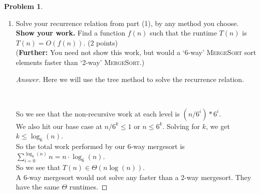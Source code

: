 \documentclass[11pt]{article}
\theoremstyle{definition}
\theoremstyle{definition}
\newtheorem{required}{Problem}
\theoremstyle{definition}
\begin{document}
\begin{required}
\begin{enumerate}
\begin{proof}[Answer]
\end{proof}

\vspace{1in}

\item Solve your recurrence relation from part (1), by any method you choose. \textbf{Show your work.}  Find a function $f(n)$ such that the runtime $T(n)$ is $T(n) = O(f(n))$. (2 points) \\
(\textbf{Further: } You need not show this work, but would a `6-way' \textsc{MergeSort} sort elements faster than `2-way' \textsc{MergeSort}.)

\begin{proof}[Answer]
Here we will use the tree method to solve the recurrence relation.\\

\begin{center}
	\\
\end{center}

So we see that the non-recursive work at each level is $(n/6^i) * 6^i$.\\

We also hit our base case at $n/6^k \leq 1$ or $n \leq 6^k$. Solving for $k$, we get $k \leq \log_6(n)$.\\

So the total work performed by our 6-way mergesort is $\displaystyle\sum_{i=0} ^{\log_6(n)} n = n \cdot \log_6(n)$.\\

So we see that $T(n) \in \Theta(n\log(n))$.\\

A 6-way mergesort would not solve any faster than a 2-way mergesort. They have the same $\Theta$ runtimes.
\end{proof}

\vspace{1in}

\end{enumerate}

\end{required}

\end{document}

